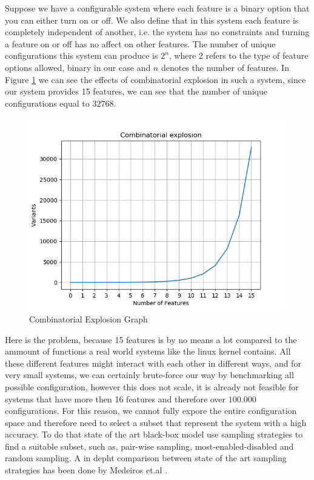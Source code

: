 Suppose we have a configurable system where each feature is a binary option that you can either turn on or off. We also define 
that in this system each feature is completely independent of another, i.e. the system has no constraints and turning a feature on or off
has no affect on other features. The number of unique configurations this system can produce is $2^n$, where $2$ refers to
the type of feature options allowed, binary in our case and $n$ denotes the number of features. In Figure \ref{fig:Combinatorial-Explosion-Graph}
we can see the effects of combinatorial explosion in such a system, since our system provides 15 features, we can see that the number of 
unique configurations equal to $32768$. 

\begin{figure}[h]
    \centering
    \includegraphics[scale=0.6]{gfx/Combinatorial_explosion_graph.png}
    \caption{Combinatorial Explosion Graph}
    \label{fig:Combinatorial-Explosion-Graph}
\end{figure}

Here is the problem, because 15 features is by no means a lot compared to the ammount of functions a real world systems like the
linux kernel contains. All these different features might interact with each other in different ways, and for very small systems,
we can certainly brute-force our way by benchmarking all possible configuration, however this does not scale, it is already not feasible for systems that
have more then 16 features and therefore over $100.000$ configurations. For this reason, we cannot fully expore the entire configuration space 
and therefore need to select a subset that represent the system with a high accuracy. To do that state of the art black-box model use sampling
strategies to find a suitable subset, such as, pair-wise sampling, most-enabled-disabled and random sampling. A in depht comparison
between state of the art sampling strategies has been done by Medeiros et.al \cite{sampling-strategies}.

